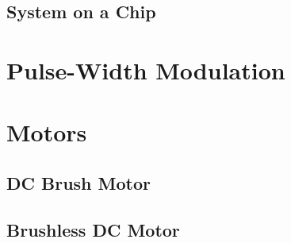 \documentclass{article}
\begin{document}
\subsection{System on a Chip}

\section{Pulse-Width Modulation}

\section{Motors}

\subsection{DC Brush Motor}

\subsection{Brushless DC Motor}
\end{document}
